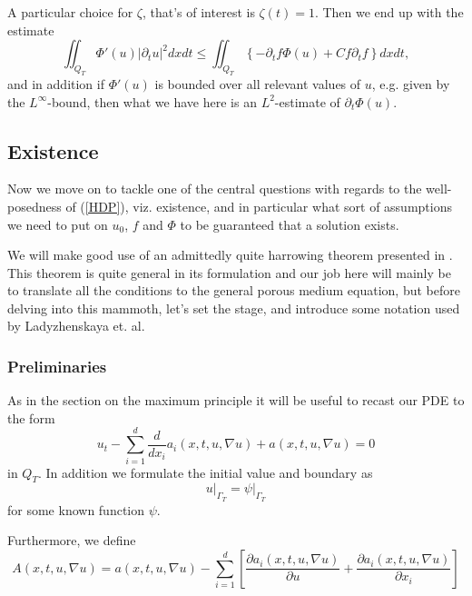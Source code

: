 \documentclass[11pt, a4paper]{article}
\begin{document}
	
A particular choice for $\zeta$, that's of interest is $\zeta(t) = 1$. Then we end up with the estimate
\begin{equation}
\label{temporal_bound}
\iint_{Q_T} \Phi'(u) |\partial_t u|^2 dxdt \leq \iint_{Q_T}\left\{ -\partial_t f \Phi(u)   +Cf\partial_tf \right\}dxdt, 
\end{equation}
and in addition if $\Phi'(u)$ is bounded over all relevant values of $u$, e.g. given by the $L^\infty$-bound, then what we have here is an $L^2$-estimate of $\partial_t \Phi(u)$.
	


\subsection{Existence}
Now we move on to tackle one of the central questions with regards to the well-posedness of (\ref{HDP}), viz. existence, and in particular what sort of assumptions we need to put on $u_0$, $f$ and $\Phi$ to be guaranteed that a solution exists.

We will make good use of an admittedly quite harrowing theorem presented in \citep{ladyzhenskaya}. This theorem is quite general in its formulation and our job here will mainly be to translate all the conditions to the general porous medium equation, but before delving into this mammoth, let's set the stage, and introduce some notation used by Ladyzhenskaya et. al.

\subsubsection{Preliminaries}

As in the section on the maximum principle it will be useful to recast our PDE to the form
\begin{equation}
\label{lady_parabolic_eq}
	u_t - \sum_{i=1}^d\frac{d}{dx_i}a_i(x,t,u,\nabla u) + a(x,t,u,\nabla u) = 0
\end{equation}
in $Q_T$. In addition we formulate the initial value and boundary as
\begin{equation}
\label{lady_bc}
	u\big|_{\Gamma_T} = \psi\big|_{\Gamma_T}
\end{equation}
for some known function $\psi$.

Furthermore, we define
\begin{equation*}
A(x,t,u,\nabla u) = a(x,t,u,\nabla u) - \sum_{i=1}^d \left[ \frac{\partial a_i(x,t,u,\nabla u)}{\partial u} + \frac{\partial a_i(x,t,u,\nabla u)}{\partial x_i} \right]
\end{equation*}
\end{document}
